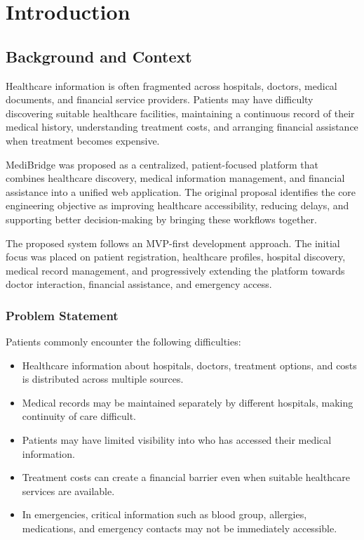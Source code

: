 \documentclass{tietreport}
\author{%
  \texttt{1024160137} Kunal Motwani \\
  \texttt{1024160058} Suryansh Pahuja%
}
\begin{document}
\maketitle

\tableofcontents


\chapter{Introduction}

\section{Background and Context}

Healthcare information is often fragmented across hospitals, doctors,
medical documents, and financial service providers. Patients may have
difficulty discovering suitable healthcare facilities, maintaining a
continuous record of their medical history, understanding treatment
costs, and arranging financial assistance when treatment becomes
expensive.

MediBridge was proposed as a centralized, patient-focused platform that
combines healthcare discovery, medical information management, and
financial assistance into a unified web application. The original
proposal identifies the core engineering objective as improving
healthcare accessibility, reducing delays, and supporting better
decision-making by bringing these workflows together.

The proposed system follows an MVP-first development approach. The
initial focus was placed on patient registration, healthcare profiles,
hospital discovery, medical record management, and progressively
extending the platform towards doctor interaction, financial assistance,
and emergency access.

\subsection{Problem Statement}

Patients commonly encounter the following difficulties:

\begin{itemize}
  \item Healthcare information about hospitals, doctors, treatment
    options, and costs is distributed across multiple sources.
  \item Medical records may be maintained separately by different
    hospitals, making continuity of care difficult.
  \item Patients may have limited visibility into who has accessed their
    medical information.
  \item Treatment costs can create a financial barrier even when
    suitable healthcare services are available.
  \item In emergencies, critical information such as blood group,
    allergies, medications, and emergency contacts may not be immediately
    accessible.
\end{itemize}
\end{document}
